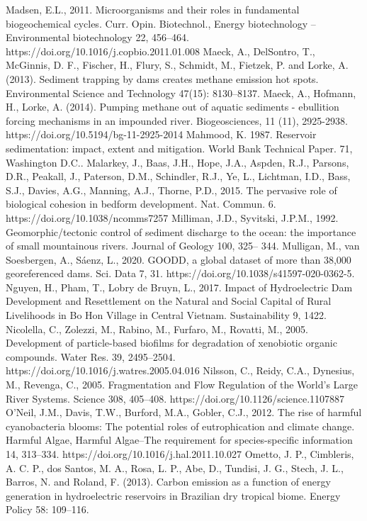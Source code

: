 \begin{thebibliography}{}
Madsen, E.L., 2011. Microorganisms and their roles in fundamental biogeochemical cycles. Curr. Opin. Biotechnol., Energy biotechnology – Environmental biotechnology 22, 456–464. https://doi.org/10.1016/j.copbio.2011.01.008
Maeck, A., DelSontro, T., McGinnis, D. F., Fischer, H., Flury, S., Schmidt, M., Fietzek, P. and Lorke, A. (2013). Sediment trapping by dams creates methane emission hot spots. Environmental Science and Technology 47(15): 8130–8137.
Maeck, A., Hofmann, H., Lorke, A. (2014). Pumping methane out of aquatic sediments - ebullition forcing mechanisms in an impounded river. Biogeosciences, 11 (11), 2925-2938. https://doi.org/10.5194/bg-11-2925-2014
Mahmood, K. 1987. Reservoir sedimentation: impact, extent and mitigation. World Bank Technical Paper. 71, Washington D.C..
Malarkey, J., Baas, J.H., Hope, J.A., Aspden, R.J., Parsons, D.R., Peakall, J., Paterson, D.M., Schindler, R.J., Ye, L., Lichtman, I.D., Bass, S.J., Davies, A.G., Manning, A.J., Thorne, P.D., 2015. The pervasive role of biological cohesion in bedform development. Nat. Commun. 6. https://doi.org/10.1038/ncomms7257
Milliman, J.D., Syvitski, J.P.M., 1992. Geomorphic/tectonic control of sediment discharge to the ocean: the importance of small mountainous rivers. Journal of Geology 100, 325– 344.
Mulligan, M., van Soesbergen, A., Sáenz, L., 2020. GOODD, a global dataset of more than 38,000 georeferenced dams. Sci. Data 7, 31. https://doi.org/10.1038/s41597-020-0362-5.
Nguyen, H., Pham, T., Lobry de Bruyn, L., 2017. Impact of Hydroelectric Dam Development and Resettlement on the Natural and Social Capital of Rural Livelihoods in Bo Hon Village in Central Vietnam. Sustainability 9, 1422.
Nicolella, C., Zolezzi, M., Rabino, M., Furfaro, M., Rovatti, M., 2005. Development of particle-based biofilms for degradation of xenobiotic organic compounds. Water Res. 39, 2495–2504. https://doi.org/10.1016/j.watres.2005.04.016
Nilsson, C., Reidy, C.A., Dynesius, M., Revenga, C., 2005. Fragmentation and Flow Regulation of the World’s Large River Systems. Science 308, 405–408. https://doi.org/10.1126/science.1107887
O’Neil, J.M., Davis, T.W., Burford, M.A., Gobler, C.J., 2012. The rise of harmful cyanobacteria blooms: The potential roles of eutrophication and climate change. Harmful Algae, Harmful Algae--The requirement for species-specific information 14, 313–334. https://doi.org/10.1016/j.hal.2011.10.027
Ometto, J. P., Cimbleris, A. C. P., dos Santos, M. A., Rosa, L. P., Abe, D., Tundisi, J. G., Stech, J. L., Barros, N. and Roland, F. (2013). Carbon emission as a function of energy generation in hydroelectric reservoirs in Brazilian dry tropical biome. Energy Policy 58: 109–116.

\end{thebibliography}
